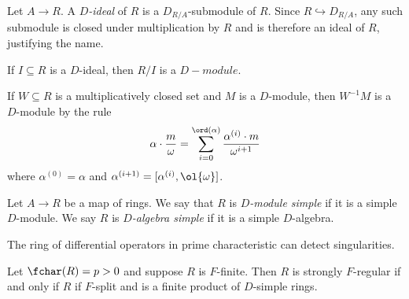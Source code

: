 \begin{defn}\label{defn:D-ideal}
	Let $A\to R$. A \emph{$D$-ideal} of $R$ is a $D_{R/A}$-submodule of $R$. Since $R \hookrightarrow D_{R/A}$, any such submodule is closed under multiplication by $R$ and is therefore an ideal of $R$, justifying the name.
\end{defn}

\begin{example}\label{ex:quotient-is-d-mod}
	If $I \subseteq R$ is a $D$-ideal, then $R/I$ is a $D-module$.
\end{example}

\begin{prop}\label{prop:localization-of-D-mod}
	If $W \subseteq R$ is a multiplicatively closed set and $M$ is a $D$-module, then $W^{-1}M$ is a $D$-module by the rule
	\begin{align*}
		\alpha\cdot \frac{m}{\omega} = \sum_{i = 0}^{\ord(\alpha)} \frac{\alpha^{(i)}\cdot m}{\omega^{i+1}}
	\end{align*}
	where $\alpha^{(0)} = \alpha$ and $\alpha^{(i+1)} = [\alpha^{(i)}, \ol{\omega}]$.
\end{prop}

\begin{defn}\label{defn:D-module-simple}
	Let $A\to R$ be a map of rings. We say that $R$ is \emph{$D$-module simple} if it is a simple $D$-module. We say $R$ is \emph{$D$-algebra simple} if it is a simple $D$-algebra.
\end{defn}

The ring of differential operators in prime characteristic can detect singularities. 

\begin{thm}\label{thm:strongly-F-regular-rings-D-simple}
	Let $\fchar(R) = p > 0$ and suppose $R$ is $F$-finite. Then $R$ is strongly $F$-regular if and only if $R$ if $F$-split and is a finite product of $D$-simple rings.
\end{thm}
\newpage
\printbibliography

